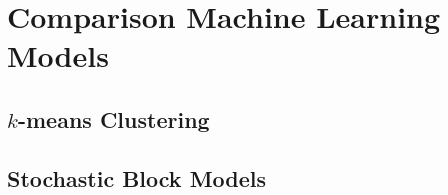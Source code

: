 
\chapter{Comparison Machine Learning Models}
\label{ch:comparison}
\vspace{2em}

\section{$k$-means Clustering}
\section{Stochastic Block Models}
